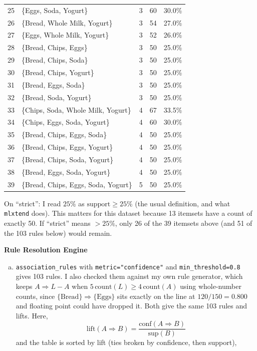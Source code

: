 \documentclass[12pt,letterpaper, onecolumn]{exam}
\begin{document}
\begin{questions}
\begin{solution}
{\begin{longtable}{|c|l|c|c|c|}
            25 & \{Eggs, Soda, Yogurt\} & 3 & 60 & 30.0\% \\
            26 & \{Bread, Whole Milk, Yogurt\} & 3 & 54 & 27.0\% \\
            27 & \{Eggs, Whole Milk, Yogurt\} & 3 & 52 & 26.0\% \\
            28 & \{Bread, Chips, Eggs\} & 3 & 50 & 25.0\% \\
            29 & \{Bread, Chips, Soda\} & 3 & 50 & 25.0\% \\
            30 & \{Bread, Chips, Yogurt\} & 3 & 50 & 25.0\% \\
            31 & \{Bread, Eggs, Soda\} & 3 & 50 & 25.0\% \\
            32 & \{Bread, Soda, Yogurt\} & 3 & 50 & 25.0\% \\
            33 & \{Chips, Soda, Whole Milk, Yogurt\} & 4 & 67 & 33.5\% \\
            34 & \{Chips, Eggs, Soda, Yogurt\} & 4 & 60 & 30.0\% \\
            35 & \{Bread, Chips, Eggs, Soda\} & 4 & 50 & 25.0\% \\
            36 & \{Bread, Chips, Eggs, Yogurt\} & 4 & 50 & 25.0\% \\
            37 & \{Bread, Chips, Soda, Yogurt\} & 4 & 50 & 25.0\% \\
            38 & \{Bread, Eggs, Soda, Yogurt\} & 4 & 50 & 25.0\% \\
            39 & \{Bread, Chips, Eggs, Soda, Yogurt\} & 5 & 50 & 25.0\% \\
        \end{longtable}
        }

        On ``strict'': I read $25\%$ as $\text{support}\geq25\%$ (the usual definition, and what \texttt{mlxtend} does). This matters for this dataset because 13 itemsets have a count of exactly 50. If ``strict'' means $>25\%$, only 26 of the 39 itemsets above (and 51 of the 103 rules below) would remain.

        \textbf{Rule Resolution Engine}
        \begin{enumerate}[a.)]
            \item \texttt{association\_rules} with \texttt{metric="confidence"} and \texttt{min\_threshold=0.8} gives 103 rules. I also checked them against my own rule generator, which keeps $A\Rightarrow L-A$ when $5\,\text{count}(L)\geq4\,\text{count}(A)$ using whole-number counts, since $\{\text{Bread}\}\Rightarrow\{\text{Eggs}\}$ sits exactly on the line at $120/150=0.800$ and floating point could have dropped it. Both give the same 103 rules and lifts. Here,
            \begin{equation*}
                \text{lift}(A\Rightarrow B) = \frac{\text{conf}(A\Rightarrow B)}{\text{sup}(B)}
            \end{equation*}
            and the table is sorted by lift (ties broken by confidence, then support),
        \end{enumerate}


\end{solution}
\end{questions}
\end{document}
